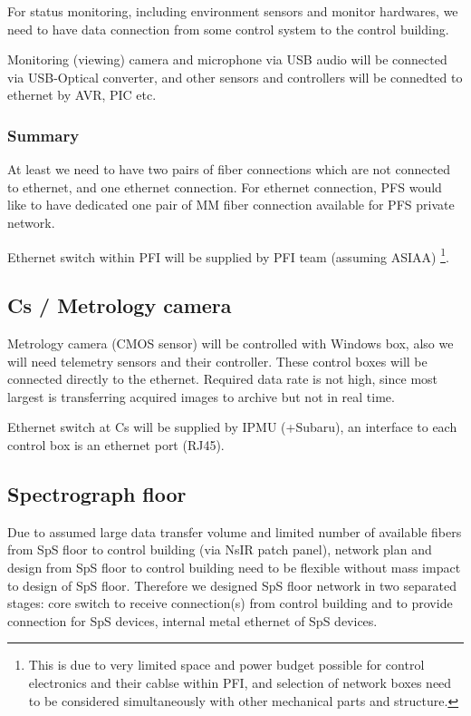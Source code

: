 \documentclass[a4paper,notitlepage]{article}
\begin{document}
For status monitoring, including environment sensors and monitor hardwares, 
we need to have data connection from some control system to the control 
building. 

Monitoring (viewing) camera and microphone via USB audio will be 
connected via USB-Optical converter, and other sensors and controllers will be 
connedted to ethernet by AVR, PIC etc. 

\subsubsection{Summary}

At least we need to have two pairs of fiber connections which are not 
connected to ethernet, and one ethernet connection. 
For ethernet connection, PFS would like to have dedicated one pair of MM fiber 
connection available for PFS private network. 

Ethernet switch within PFI will be supplied by PFI team (assuming ASIAA)
\footnote{This is due to very limited space and power budget possible for 
control electronics and their cablse within PFI, and selection of network 
boxes need to be considered simultaneously with other mechanical parts and 
structure.}. 

\subsection{Cs / Metrology camera}

Metrology camera (CMOS sensor) will be controlled with Windows box, 
also we will need telemetry sensors and their controller. 
These control boxes will be connected directly to the ethernet. 
Required data rate is not high, since most largest is transferring acquired 
images to archive but not in real time. 

Ethernet switch at Cs will be supplied by IPMU (+Subaru), an interface to 
each control box is an ethernet port (RJ45). 

\subsection{Spectrograph floor}

Due to assumed large data transfer volume and limited number of available 
fibers from SpS floor to control building (via NsIR patch panel), 
network plan and design from SpS floor to control building need to be 
flexible without mass impact to design of SpS floor. 
Therefore we designed SpS floor network in two separated stages: core switch 
to receive connection(s) from control building and to provide connection 
for SpS devices, internal metal ethernet of SpS devices. 
\end{document}
